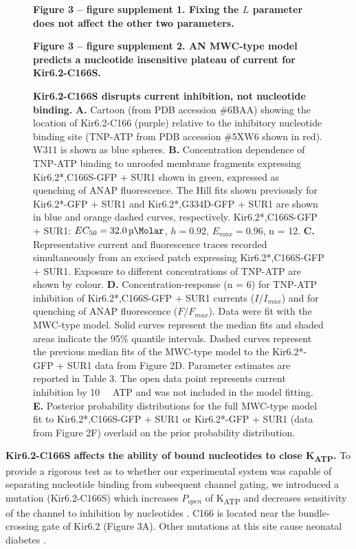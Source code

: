 \documentclass[10pt,lineno, doublespacing]{elife}
\begin{document}
\begin{figure}\ContinuedFloat
\begin{fullwidth}
\caption{
\textbf{Kir6.2-C166S disrupts current inhibition, not nucleotide binding.}
\textbf{A.}
Cartoon (from PDB accession \#6BAA) showing the location of Kir6.2-C166 (purple) relative to the inhibitory nucleotide binding site (TNP-ATP from PDB accession \#5XW6 shown in red).
W311 is shown as blue spheres.
\textbf{B.}
Concentration dependence of TNP-ATP binding to unroofed membrane fragments expressing Kir6.2*,C166S-GFP + SUR1 shown in green, expressed as quenching of ANAP fluorescence.
The Hill fits shown previously for Kir6.2*-GFP + SUR1 and Kir6.2*,G334D-GFP + SUR1 are shown in blue and orange dashed curves, respectively.
Kir6.2*,C166S-GFP + SUR1: $EC_{50} = \SI{32.0}{\micro\Molar}$, $h = 0.92$, $E_{max} = 0.96$, n = 12.
\textbf{C.}
Representative current and fluorescence traces recorded simultaneously from an excised patch expressing Kir6.2*,C166S-GFP + SUR1.
Exposure to different concentrations of TNP-ATP are shown by colour.
\textbf{D.}
Concentration-response (n = 6) for TNP-ATP inhibition of Kir6.2*,C166S-GFP + SUR1 currents ($I/I_{max}$) and for quenching of ANAP fluorescence ($F/F_{max}$).
Data were fit with the MWC-type model.
Solid curves represent the median fits and shaded areas indicate the 95\% quantile intervals.
Dashed curves represent the previous median fits of the MWC-type model to the Kir6.2*-GFP + SUR1 data from Figure 2D.
Parameter estimates are reported in Table 3.
The open data point represents current inhibition by \SI{10}{\milli\Molar} ATP and was not included in the model fitting.
\textbf{E.} Posterior probability distributions for the full MWC-type model fit to Kir6.2*,C166S-GFP + SUR1 or Kir6.2*-GFP + SUR1 (data from Figure 2F) overlaid on the prior probability distribution.
}
\raggedright
\textbf{\small Figure 3 -- figure supplement 1. Fixing the $L$ parameter does not affect the other two parameters.}

\textbf{\small Figure 3 -- figure supplement 2. AN MWC-type model predicts a nucleotide insensitive plateau of current for Kir6.2-C166S.}

\end{fullwidth}
\end{figure}

\textbf{Kir6.2-C166S affects the ability of bound nucleotides to close K\textsubscript{ATP}.}
To provide a rigorous test as to whether our experimental system was capable of separating nucleotide binding from subsequent channel gating, we introduced a mutation (Kir6.2-C166S) which increases $P_{open}$ of K\textsubscript{ATP} and decreases sensitivity of the channel to inhibition by nucleotides \citep{RN92}.
C166 is located near the bundle-crossing gate of Kir6.2 (Figure 3A).
Other mutations at this site cause neonatal diabetes \citep{RN93, RN94}.
\end{document}

